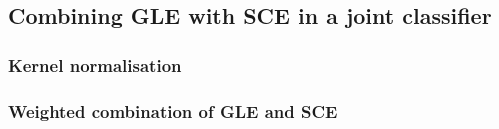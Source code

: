 

\subsection{Combining GLE with SCE in a joint classifier}\label{methods:ml_both}

\subsubsection{Kernel normalisation}



\subsubsection{Weighted combination of GLE and SCE}

